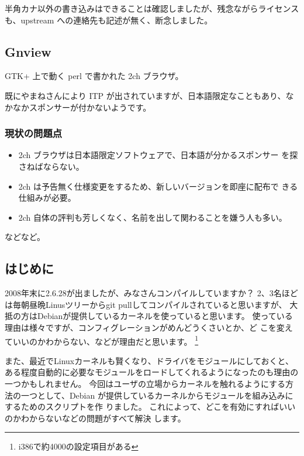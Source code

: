 \documentclass[mingoth,a4paper]{jsarticle}
\begin{document}

半角カナ以外の書き込みはできることは確認しましたが、残念ながらライセンス
も、upstream への連絡先も記述が無く、断念しました。

\subsection{Gnview}

{GTK+ 上で動く perl で書かれた 2ch ブラウザ。}

既にやまねさんにより ITP が出されていますが、日本語限定なこともあり、な
かなかスポンサーが付かないようです。

\subsubsection{現状の問題点}
\begin{itemize}
 \item 2ch ブラウザは日本語限定ソフトウェアで、日本語が分かるスポンサー
       を探さねばならない。
 \item 2ch は予告無く仕様変更をするため、新しいバージョンを即座に配布で
       きる仕組みが必要。
 \item 2ch 自体の評判も芳しくなく、名前を出して関わることを嫌う人も多い。
\end{itemize}
などなど。


\subsection{はじめに}
2008年末に2.6.28が出ましたが、みなさんコンパイルしていますか？
2、3名ほどは毎朝昼晩Linusツリーからgit pullしてコンパイルされていると思いますが、
大抵の方はDebianが提供しているカーネルを使っていると思います。
使っている理由は様々ですが、コンフィグレーションがめんどうくさいとか、ど
こを変えていいのかわからない、などが理由だと思います。
\footnote{i386で約4000の設定項目がある}

また、最近でLinuxカーネルも賢くなり、ドライバをモジュールにしておくと、
ある程度自動的に必要なモジュールをロードしてくれるようになったのも理由の
一つかもしれません。
今回はユーザの立場からカーネルを触れるようにする方法の一つとして、Debian
が提供しているカーネルからモジュールを組み込みにするためのスクリプトを作
りました。
これによって、どこを有効にすればいいのかわからないなどの問題がすべて解決
します。
\end{document}
